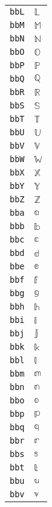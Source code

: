 \begin{longtable}{ll}
\texttt{bbL}&${}\mathbb{L}{}$\\
\texttt{bbM}&${}\mathbb{M}{}$\\
\texttt{bbN}&${}\mathbb{N}{}$\\
\texttt{bbO}&${}\mathbb{O}{}$\\
\texttt{bbP}&${}\mathbb{P}{}$\\
\texttt{bbQ}&${}\mathbb{Q}{}$\\
\texttt{bbR}&${}\mathbb{R}{}$\\
\texttt{bbS}&${}\mathbb{S}{}$\\
\texttt{bbT}&${}\mathbb{T}{}$\\
\texttt{bbU}&${}\mathbb{U}{}$\\
\texttt{bbV}&${}\mathbb{V}{}$\\
\texttt{bbW}&${}\mathbb{W}{}$\\
\texttt{bbX}&${}\mathbb{X}{}$\\
\texttt{bbY}&${}\mathbb{Y}{}$\\
\texttt{bbZ}&${}\mathbb{Z}{}$\\
\texttt{bba}&${}\mathbb{a}{}$\\
\texttt{bbb}&${}\mathbb{b}{}$\\
\texttt{bbc}&${}\mathbb{c}{}$\\
\texttt{bbd}&${}\mathbb{d}{}$\\
\texttt{bbe}&${}\mathbb{e}{}$\\
\texttt{bbf}&${}\mathbb{f}{}$\\
\texttt{bbg}&${}\mathbb{g}{}$\\
\texttt{bbh}&${}\mathbb{h}{}$\\
\texttt{bbi}&${}\mathbb{i}{}$\\
\texttt{bbj}&${}\mathbb{j}{}$\\
\texttt{bbk}&${}\mathbb{k}{}$\\
\texttt{bbl}&${}\mathbb{l}{}$\\
\texttt{bbm}&${}\mathbb{m}{}$\\
\texttt{bbn}&${}\mathbb{n}{}$\\
\texttt{bbo}&${}\mathbb{o}{}$\\
\texttt{bbp}&${}\mathbb{p}{}$\\
\texttt{bbq}&${}\mathbb{q}{}$\\
\texttt{bbr}&${}\mathbb{r}{}$\\
\texttt{bbs}&${}\mathbb{s}{}$\\
\texttt{bbt}&${}\mathbb{t}{}$\\
\texttt{bbu}&${}\mathbb{u}{}$\\
\texttt{bbv}&${}\mathbb{v}{}$\\

\end{longtable}
